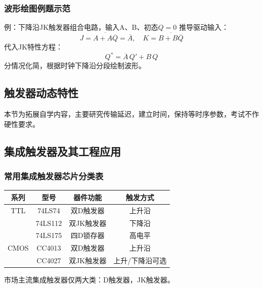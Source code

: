 \subsubsection{波形绘图例题示范}
例：下降沿JK触发器组合电路，输入A、B、初态$Q=0$
推导驱动输入：
\[
J=\overline{A+A\overline{Q}}=\overline{A},\quad K=\overline{B+B\overline{Q}}
\]
代入JK特性方程：
\[
Q^* = \overline{A}\,Q' + B\,Q
\]
分情况化简，根据时钟下降沿分段绘制波形。

\subsection{触发器动态特性}
本节为拓展自学内容，主要研究传输延迟，建立时间，保持等时序参数，考试不作硬性要求。

\subsection{集成触发器及其工程应用}
\subsubsection{常用集成触发器芯片分类表}
\begin{center}
\setlength{\tabcolsep}{2pt}\tiny
\begin{tabular}{cccc}
\toprule
系列 & 型号 & 器件功能 & 触发方式 \\
\midrule
TTL & 74LS74 & 双D触发器 & 上升沿 \\
& 74LS112 & 双JK触发器 & 下降沿 \\
& 74LS175 & 四D锁存器 & 高电平 \\
CMOS & CC4013 & 双D触发器 & 上升沿 \\
& CC4027 & 双JK触发器 & 上升/下降沿可选 \\
\bottomrule
\end{tabular}
\end{center}
市场主流集成触发器仅两大类：D触发器，JK触发器。

